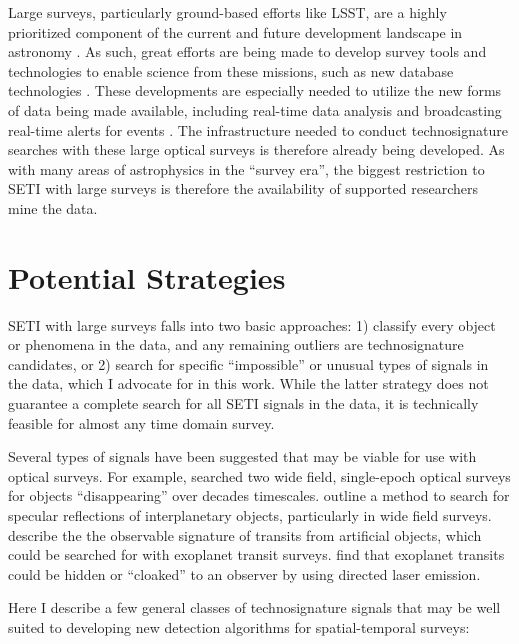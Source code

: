 \documentclass[twocolumn]{aastex62}
\begin{document}
Large surveys, particularly ground-based efforts like LSST, are a highly prioritized component of the current and future development landscape in astronomy \citep{astro2010}. As such, great efforts are being made to develop survey tools and technologies to enable science from these missions, such as new database technologies \citep{juric2012}. These developments are especially needed to utilize the new forms of data being made available, including real-time data analysis \citep[e.g.][]{schwamb2019} and broadcasting real-time alerts for events \citep{patterson2019}.
The infrastructure needed to conduct technosignature searches with these large optical surveys is therefore already being developed. As with many areas of astrophysics in the ``survey era'', the biggest restriction to SETI with large surveys is therefore the availability of supported researchers mine the data.




\section{Potential Strategies}
\label{sec:strategy}

SETI with large surveys falls into two basic approaches: 1) classify every object or phenomena in the data, and any remaining outliers are technosignature candidates, or 2) search for specific ``impossible'' or unusual types of signals in the data, which I advocate for in this work. While the latter strategy does not guarantee a complete search for all SETI signals in the data, it is technically feasible for almost any time domain survey. 

Several types of signals have been suggested that may be viable for use with optical surveys. For example, \citet{villarroel2016} searched two wide field, single-epoch optical surveys for objects ``disappearing''  over decades timescales. \citet{lacki2019} outline a method to search for specular reflections of interplanetary objects, particularly in wide field surveys. \citet{arnold2005} describe the the observable signature of transits from artificial objects, which could be searched for with exoplanet transit surveys. \citet{kipping2016} find that exoplanet transits could be hidden or ``cloaked'' to an observer by using directed laser emission.

Here I describe a few general classes of technosignature signals that may be well suited to developing new detection algorithms for spatial-temporal surveys:
\end{document}
